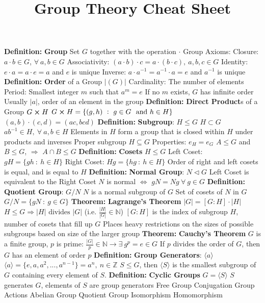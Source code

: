 \documentclass[14pt]{extarticle}
\title{Group Theory Cheat Sheet}
\def\Definition{{\color{blue} \textbf{Definition:} }}
\def\Theorem{{\color{red} \textbf{Theorem:} }}
\begin{document}
	\maketitle
	\begin{outline}		
		\1	\Definition \textbf{Group}
			\2	Set $G$ together with the operation $\cdot$
			\2	Group Axioms:
				\3	Closure:	$a \cdot b \in G$, $\forall~a,b \in G$
				\3	Associativity:	$(a \cdot b) \cdot c = a \cdot (b \cdot c),~a,b,c \in G$
				\3	Identity:	$e \cdot a = a \cdot e = a$ and $e$ is unique
				\3	Inverse: $a \cdot a^{-1} = a^{-1} \cdot a = e$ and $a^{-1}$ is unique
		\1	\Definition \textbf{Order} of a Group $|(G)|$
			\2	Cardinality:	The number of elements
			\2	Period:	Smallest integer $m$ such that $a^m = e$
				\3	If no $m$ exists, $G$ has infinite order
				\3	Usually $|a|$, order of an element in the group
		\1	\Definition \textbf{Direct Product}s of a Group $G \cross H$
			\2	$G \cross H = \{(g,h)~:~g \in G~\text{ and } h \in H\}$
			\2	$(a,b) \cdot (c,d) = (ac,bcd)$
		\1	\Definition \textbf{Subgroup}: $H \le G$
			\2	$H \subset G$
			\2	$ab^{-1} \in H,~\forall~a,b \in H$
			\2	Elements in $H$ form a group that is closed within $H$ under products and inverses
			\2	Proper subgroup $H \subseteq G$
			\2	Properties:
				\3	$e_H = e_G$
				\3	$A \le G$ and $B \le G$, $\Rightarrow$ $A \cap B \le G$
		\1	\Definition \textbf{Cosets}
			\2	$H \le G$
			\2	Left Coset:	 $gH = \{gh~:~h \in H\}$
			\2	Right Coset: $Hg = \{hg~:~h \in H\}$	
			\2	Order of right and left cosets is equal, and is equal to $H$
		\1	\Definition \textbf{Normal Group}: $N \triangleleft G$
			\2	Left Coset is equivalent to the Right Coset
			\2	$N$ is normal $\Leftrightarrow$ $gN = Ng~\forall~g \in G$
		\1	\Definition \textbf{Quotient Group}: $G/N$
			\2	$N$ is a normal subgroup of $G$
			\2	Set of cosets of $N$ in $G$
			\2	$G/N = \{g N~:~g \in G\}$	
		\1	\Theorem \textbf{Lagrange's Theorem}
			\2	$|G| = [G:H] \cdot |H|$
			\2	$H \le G \Rightarrow |H| \text{ divides } |G|$ (i.e. $\frac{|H|}{|G|} \in \mathbb{N}$)
			\2	$[G : H]$ is the index of subgroup $H$, number of cosets that fill
					up $G$
			\2	Places heavy restrictions on the sizes of possible subgroups based
					on size of the larger group
		\1	\Theorem \textbf{Cauchy's Theorem}
			\2	$G$ is a finite group, $p$ is prime: $\frac{|G|}{p} \in \mathbb{N} \rightarrow \exists~g^p = e \in G$
			\2	If $p$ divides the order of $G$, then $G$ has an element of order $p$
		\1	\Definition \textbf{Group Generators}: $\langle a \rangle$
			\2	$\langle a \rangle = \{e,a,a^2,...,a^{n-1}\} = a^n,~n \in \mathbb{Z}$
			\2	$S \le G$, then $\langle S \rangle$ is the smallest subgroup of $G$ containing
					every element of $S$.
		\1	\Definition \textbf{Cyclic Groups}
			\2	$G = \langle S \rangle$
			\2	$S$ generates $G$, elements of $S$ are group generators
		\1	Free Group	
		\1	Conjugation
		\1	Group Actions
		\1	Abelian Group
		\1	Quotient Group
		\1	Isomorphism
		\1	Homomorphism

	\end{outline}
\end{document}
